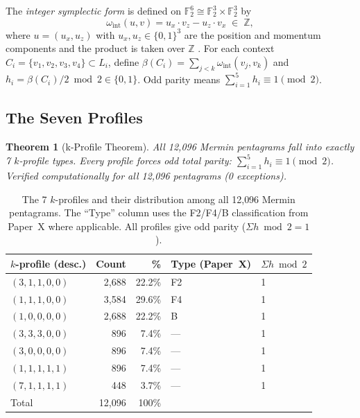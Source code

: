 \documentclass[11pt,a4paper]{article}
\newtheorem{theorem}{Theorem}[section]
\theoremstyle{remark}
\begin{document}
The \emph{integer symplectic form} is defined on
$\mathbb{F}_2^6 \cong \mathbb{F}_2^3 \times \mathbb{F}_2^3$ by
\[
  \omega_{\mathrm{int}}(u,v) = u_x \cdot v_z - u_z \cdot v_x \;\in\; \mathbb{Z},
\]
where $u = (u_x, u_z)$ with $u_x, u_z \in \{0,1\}^3$ are the
position and momentum components and the product is taken over $\mathbb{Z}$
\cite{PaperXI}.
For each context $C_i = \{v_1,v_2,v_3,v_4\} \subset L_i$, define
$\beta(C_i) = \sum_{j<k} \omega_{\mathrm{int}}(v_j,v_k)$ and
$h_i = \beta(C_i)/2 \bmod 2 \in \{0,1\}$.
Odd parity means $\sum_{i=1}^5 h_i \equiv 1\pmod 2$.

\subsection{The Seven Profiles}

\begin{theorem}[k-Profile Theorem]\label{thm:kprofile}
All 12{,}096 Mermin pentagrams fall into exactly 7 $k$-profile types.
Every profile forces odd total parity: $\sum_{i=1}^5 h_i \equiv 1 \pmod 2$.
Verified computationally for all 12{,}096 pentagrams (0 exceptions).
\end{theorem}

\begin{table}[H]
\centering
\caption{The 7 $k$-profiles and their distribution among all 12{,}096 Mermin
pentagrams. The ``Type'' column uses the F2/F4/B classification from Paper~X
\cite{PaperX} where applicable. All profiles give odd parity ($\Sigma h \bmod 2 = 1$).}
\label{tab:kprofiles}
\begin{tabular}{lrrll}
\toprule
$k$-profile (desc.) & Count & \% & Type (Paper~X) & $\Sigma h \bmod 2$ \\
\midrule
$(3,1,1,0,0)$ & 2{,}688 & 22.2\% & F2 & 1 \\
$(1,1,1,0,0)$ & 3{,}584 & 29.6\% & F4 & 1 \\
$(1,0,0,0,0)$ & 2{,}688 & 22.2\% & B  & 1 \\
$(3,3,3,0,0)$ &    896 &  7.4\% & —  & 1 \\
$(3,0,0,0,0)$ &    896 &  7.4\% & —  & 1 \\
$(1,1,1,1,1)$ &    896 &  7.4\% & —  & 1 \\
$(7,1,1,1,1)$ &    448 &  3.7\% & —  & 1 \\
\midrule
Total         & 12{,}096 & 100\% & & \\
\bottomrule
\end{tabular}
\end{table}
\end{document}
